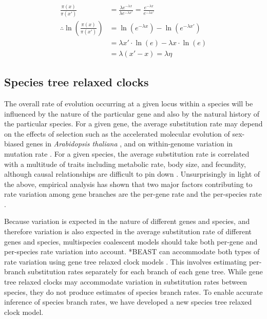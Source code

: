 \documentclass[nogrid]{MBE}%
\begin{document}
\begin{align}
\frac{\pi(x)}{\pi(x')} &= \frac{\lambda e^{-\lambda x}}{\lambda e^{-\lambda x'}} = \frac{e^{-\lambda x}}{e^{-\lambda x'}}\\
\therefore \ln\left(\frac{\pi(x)}{\pi(x')}\right) &= \ln \left(e^{-\lambda x}\right) - \ln \left(e^{-\lambda x'}\right)\\
& = \lambda x' \cdot \ln \left(e\right) - \lambda x \cdot \ln \left(e\right)\\
& = \lambda \left(x' - x\right) = \lambda \eta
\end{align}

\subsection{Species tree relaxed clocks}

The overall rate of evolution occurring at a given locus within a species will
be influenced by the nature of the particular gene and also by the natural
history of the particular species. For a given gene, the average substitution
rate may depend on the effects of selection such as the accelerated molecular
evolution of sex-biased genes in \textit{Arabidopsis thaliana}
\citep{Gossmann01032014}, and on within-genome variation in mutation rate \citep{Baer2007}.
For a given species, the average substitution rate is correlated with a
multitude of traits including metabolic rate, body size, and fecundity, although
causal relationships are difficult to pin down \citep{Bromham2503}.
Unsurprisingly in light of the above, empirical analysis has shown that two
major factors contributing to rate variation among gene branches are the
per-gene rate and the per-species rate \citep{Rasmussen01122007}.

Because variation is expected in the nature of different genes and species, and
therefore variation is also expected in the average substitution rate of different
genes and species, multispecies coalescent models should take both per-gene and
per-species rate variation into account. *BEAST can accommodate both types of
rate variation using gene tree relaxed clock models \citep[for examples see][]{Berv2014120, Lambert2015146}.
This involves estimating per-branch substitution rates separately
for each branch of each gene tree. While gene tree relaxed clocks may
accommodate variation in substitution rates between species, they do not produce
estimates of species branch rates. To enable accurate inference of species
branch rates, we have developed a new species tree relaxed clock model.
\end{document}
